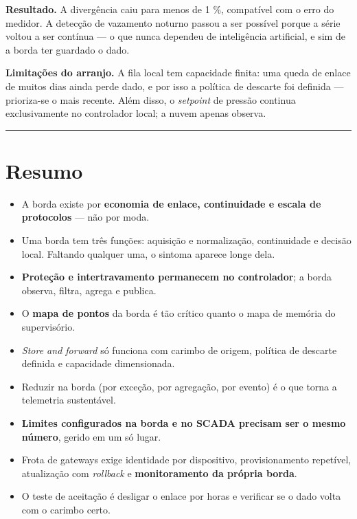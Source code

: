 \textbf{Resultado.} A divergência caiu para menos de 1 \%, compatível com o erro do medidor. A detecção de
vazamento noturno passou a ser possível porque a série voltou a ser contínua --- o que nunca dependeu
de inteligência artificial, e sim de a borda ter guardado o dado.

\textbf{Limitações do arranjo.} A fila local tem capacidade finita: uma queda de enlace de muitos dias
ainda perde dado, e por isso a política de descarte foi definida --- prioriza-se o mais recente. Além
disso, o \emph{setpoint} de pressão continua exclusivamente no controlador local; a nuvem apenas observa.

\begin{center}\rule{0.5\linewidth}{0.5pt}\end{center}

\section{Resumo}\label{resumo}

\begin{itemize}
\tightlist
\item
  A borda existe por \textbf{economia de enlace, continuidade e escala de protocolos} --- não por moda.
\item
  Uma borda tem três funções: aquisição e normalização, continuidade e decisão local. Faltando
  qualquer uma, o sintoma aparece longe dela.
\item
  \textbf{Proteção e intertravamento permanecem no controlador}; a borda observa, filtra, agrega e
  publica.
\item
  O \textbf{mapa de pontos} da borda é tão crítico quanto o mapa de memória do supervisório.
\item
  \emph{Store and forward} só funciona com carimbo de origem, política de descarte definida e capacidade
  dimensionada.
\item
  Reduzir na borda (por exceção, por agregação, por evento) é o que torna a telemetria sustentável.
\item
  \textbf{Limites configurados na borda e no SCADA precisam ser o mesmo número}, gerido em um só lugar.
\item
  Frota de gateways exige identidade por dispositivo, provisionamento repetível, atualização com
  \emph{rollback} e \textbf{monitoramento da própria borda}.
\item
  O teste de aceitação é desligar o enlace por horas e verificar se o dado volta com o carimbo certo.
\end{itemize}

